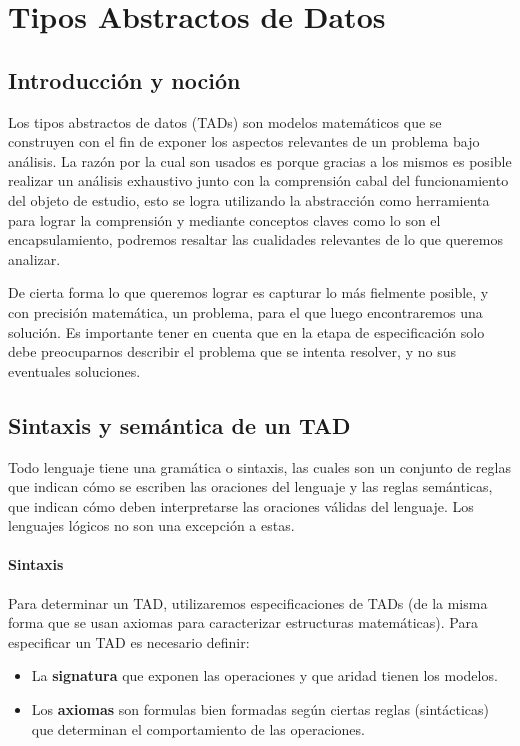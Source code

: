 \documentclass[10pt, a4paper]{report}
\begin{document}
\tableofcontents

\chapter{Tipos Abstractos de Datos}

\section{Introducci\'on y noci\'on}
Los tipos abstractos de datos (TADs) son modelos matem\'aticos que se construyen con el fin de exponer los aspectos relevantes de un problema bajo an\'alisis. La raz\'on por la cual son usados es porque gracias a los mismos es posible realizar un an\'alisis exhaustivo junto con la comprensi\'on cabal del funcionamiento del objeto de estudio, esto se logra utilizando la abstracci\'on como herramienta para lograr la comprensi\'on y mediante conceptos claves como lo son el encapsulamiento, podremos resaltar las cualidades relevantes de lo que queremos analizar.

De cierta forma lo que queremos lograr es capturar lo m\'as fielmente posible, y con precisi\'on matem\'atica, un problema, para el que luego encontraremos una soluci\'on. Es importante tener en cuenta que en la etapa de especificaci\'on solo debe preocuparnos describir el problema que se intenta resolver, y no sus eventuales soluciones.

\section{Sintaxis y sem\'antica de un TAD}

Todo lenguaje tiene una gram\'atica o sintaxis, las cuales son un conjunto de reglas que indican c\'omo se escriben las oraciones del lenguaje y las reglas sem\'anticas, que indican c\'omo deben interpretarse las oraciones v\'alidas del lenguaje. Los lenguajes l\'ogicos no son una excepci\'on a estas.

\subsubsection*{Sintaxis}

Para determinar un TAD, utilizaremos especificaciones de TADs (de la misma forma que se usan axiomas para caracterizar estructuras matem\'aticas). Para especificar un TAD es necesario definir:

\begin{itemize}
 \item La \textbf{signatura} que exponen las operaciones y que aridad tienen los modelos.
 \item Los \textbf{axiomas} son formulas bien formadas seg\'un ciertas reglas (sint\'acticas) que determinan el comportamiento de las operaciones.
\end{itemize}
\end{document}
